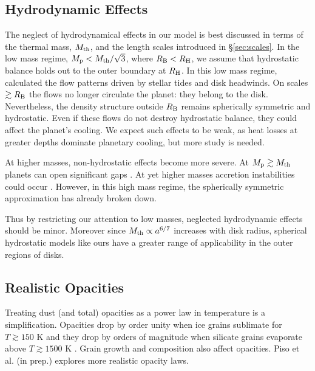 \documentclass[apj, numberedappendix]{emulateapj}
\newcommand{\RB}{R_{\rm B}}
\newcommand{\RH}{R_{\rm H}}
\newcommand{\pla}{_{\rm p}}
\begin{document}
\subsection{Hydrodynamic Effects}\label{sec:hydro}
The neglect of hydrodynamical effects in our model is best discussed in terms of the thermal mass, $M_{\rm th}$, and the length scales introduced in \S\ref{sec:scales}.  In the low mass regime, $M\pla < M_{\rm th}/ \sqrt{3}$, where $\RB < \RH$, we assume that hydrostatic balance holds out to the outer boundary at $\RH$.   In this low mass regime, \citet[]{Orm13} calculated the flow patterns driven by stellar tides and disk headwinds.     On scales $\gtrsim \RB$ the flows no longer circulate the planet: they belong to the disk.  Nevertheless, the density structure outside $\RB$ remains spherically symmetric and hydrostatic.  Even if these flows do not destroy hydrostatic balance, they could affect the planet's cooling.  We expect such effects to be weak, as heat losses at greater depths dominate planetary cooling, but more study is needed.

At higher masses, non-hydrostatic effects become more severe.  At $M\pla \gtrsim M_{\rm th}$ planets can open significant gaps \citep{zhu13}.  At yet higher masses accretion instabilities could occur \citep{AylBat12}.  However, in this high mass regime, the spherically symmetric approximation has already broken down. %

Thus by restricting our attention to low masses, neglected hydrodynamic effects should be minor.   Moreover since $M_{\rm th} \propto a^{6/7}$ increases with disk radius, spherical hydrostatic models like ours have a greater range of applicability in the outer regions of disks. 


\subsection{Realistic Opacities}\label{sec:op}

Treating dust (and total) opacities as a power law in temperature is a simplification.  Opacities drop by order unity when ice grains sublimate for $T \gtrsim 150$ K and they drop by orders of magnitude when silicate grains evaporate above $T \gtrsim 1500$ K \citep{semenov03, FerAle05}.  Grain growth and composition also affect opacities.  Piso et al. (in prep.) explores more realistic opacity laws.
\end{document}
